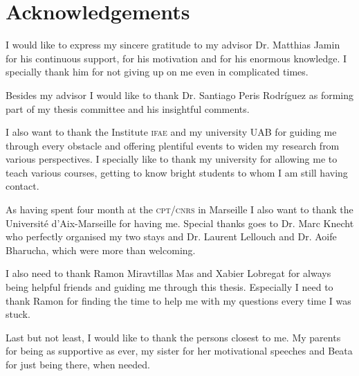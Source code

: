 \documentclass[../../index.tex]{subfiles}
\begin{document}
\chapter*{Acknowledgements}
I would like to express my sincere gratitude to my advisor Dr. Matthias Jamin
for his continuous support, for his motivation and for his enormous knowledge. I
specially thank him for not giving up on me even in complicated times.

Besides my advisor I would like to thank Dr. Santiago Peris Rodríguez as
forming part of my thesis committee and his insightful comments.

I also want to thank the Institute \textsc{ifae} and my university \textsc{UAB}
for guiding me through every obstacle and offering plentiful events to widen my
research from various perspectives. I specially like to thank my university for
allowing me to teach various courses, getting to know bright students to whom I
am still having contact.

As having spent four month at the \textsc{cpt}/\textsc{cnrs} in Marseille I also want to
thank the Université d'Aix-Marseille for having me. Special thanks goes to Dr.
Marc Knecht who perfectly organised my two stays and Dr. Laurent Lellouch and
Dr. Aoife Bharucha, which were more than welcoming.

I also need to thank Ramon Miravtillas Mas and Xabier Lobregat for always being
helpful friends and guiding me through this thesis. Especially I need to thank
Ramon for finding the time to help me with my questions every time I was
stuck.

Last but not least, I would like to thank the persons closest to me. My
parents for being as supportive as ever, my sister for her motivational speeches
and Beata for just being there, when needed.
\end{document}
